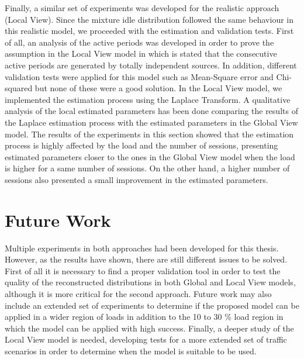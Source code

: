 Finally, a similar set of experiments was developed for the realistic approach (Local View). Since the mixture idle distribution followed the same behaviour in this realistic model, we proceeded with the estimation and validation tests. First of all, an analysis of the active periods was developed in order to prove the assumption in the Local View model in which is stated that the consecutive active periods are generated by totally independent sources. In addition, different validation tests were applied for this model such as Mean-Square error and Chi-squared but none of these were a good solution. In the Local View model, we implemented the estimation process using the Laplace Transform. A qualitative analysis of the local estimated parameters has been done comparing the results of the Laplace estimation process with the estimated parameters in the Global View model. The results of the experiments in this section showed that the estimation process is highly affected by the load and the number of sessions, presenting estimated parameters closer to the ones in the Global View model when the load is higher for a same number of sessions. On the other hand, a higher number of sessions also presented a small improvement in the estimated parameters.

\section{Future Work}
Multiple experiments in both approaches had been developed for this thesis. However, as the results have shown, there are still different issues to be solved. First of all it is necessary to find a proper validation tool in order to test the quality of the reconstructed distributions in both Global and Local View models, although it is more critical for the second approach. Future work may also include an extended set of experiments to determine if the proposed model can be applied in a wider region of loads in addition to the 10 to 30 \% load region in which the model can be applied with high success. Finally, a deeper study of the Local View model is needed, developing tests for a more extended set of traffic scenarios in order to determine when the model is suitable to be used.